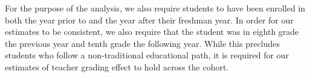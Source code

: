 \documentclass{article}\usepackage{knitr}
\begin{document}
For the purpose of the analysis, we also require students to have been enrolled in both the year prior to and the year after their freshman year. In order for our estimates to be consistent, we also require that the student was in eighth grade the previous year and tenth grade the following year. While this precludes students who follow a non-traditional educational path, it is required for our estimates of teacher grading effect to hold across the cohort. 


\newpage 

\printbibliography
\end{document}

